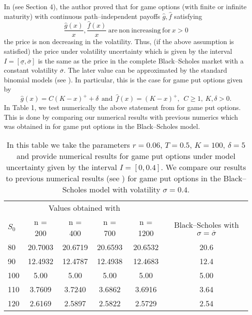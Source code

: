 \documentclass{amsart}
\numberwithin{equation}{section}
\begin{document}
In \cite{E} (see Section 4),
the author proved that for game options (with finite or infinite maturity)
with continuous path--independent payoffs $\hat g,\hat f$
satisfying
\begin{equation}\label{6.1}
\frac{\hat g(x)}{x},\frac{\hat f(x)}{x} \  \mbox{are} \ \mbox{non} \  \mbox{increasing} \ \mbox{for} \ x>0
\end{equation}
the price is non decreasing in the volatility. Thus, (if the above assumption is satisfied) the price under volatility uncertainty
which is given by the interval $I=[\underline{\sigma},\overline{\sigma}]$ is the same as the price in the complete Black--Scholes market
with a constant volatility $\overline{\sigma}$. The later value can be approximated by the standard binomial models (see \cite{Ki1}).
In particular, this is the case for game put options given by
$$\hat g(x)=C(K-x)^{+}+\delta  \ \ \mbox{and} \ \  \hat f(x)=(K-x)^{+}, \ \ C\geq 1,\ K,\delta>0.$$
In Table 1, we test numerically the above statement from \cite{E} for game put options. This is done by comparing our numerical results with previous numerics
which was obtained in \cite{KKS} for
game put options in the Black--Scholes model.
\begin{table}
\begin{center}
\caption{
In this table we take the parameters
$r = 0.06$, $T = 0.5$, $K=100$, $\delta = 5$ and provide numerical results for game put options under model uncertainty given by the
interval $I=[0,0.4]$. We compare our results to previous numerical results (see \cite{KKS}) for game put options in the
Black--Scholes model with volatility $\sigma=0.4$.}
\begin{tabular}{lccccc}
\hline
\multicolumn{5}{c}{Values obtained with }\\
\cline{2-5}
$S_0$ & n = 200 & n = 400 & n = 700 & n = 1200 & Black--Scholes with $\sigma=\overline{\sigma}$ \\
\hline
80 & 20.7003 & 20.6719 & 20.6593 &  20.6532 & 20.6   \\
90 & 12.4932 & 12.4787 & 12.4938 & 12.4683 &  12.4 \\
100 & 5.00 & 5.00 & 5.00 & 5.00 & 5.00 \\
110 & 3.7609 & 3.7240 & 3.6862 & 3.6916 &  3.64 \\
120 & 2.6169 & 2.5897 & 2.5822 & 2.5729 &  2.54  \\
\hline
\end{tabular}
\end{center}
\end{table}
\end{document}
